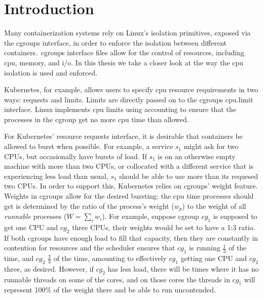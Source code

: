 
\section{Introduction}
\label{sec:introduction}

Many containerization systems rely on Linux's isolation primitives, exposed via
the cgroups interface, in order to enforce the isolation between different
containers.\ cgroups interface files allow for the control of resources,
including cpu, memory, and i/o. In this thesis we take a closer look at the way
the cpu isolation is used and enforced. 

Kubernetes\cite{kubernetes}, for example, allows users to specify cpu resource
requirements in two ways: requests and limits. Limits are directly passed on to
the cgroups cpu.limit interface. Linux implements cpu limits using accounting to
ensure that the processes in the cgroup get no more cpu time than
allowed.

For Kubernetes' resource requests interface, it is desirable that containers be
allowed to burst when possible. For example, a service $s_1$ might ask for two
CPUs, but occasionally have bursts of load. If $s_1$ is on an otherwise empty
machine with more than two CPUs, or collocated with a different service that is
experiencing less load than usual, $s_1$ should be able to use more than its
requesed two CPUs. In order to support this, Kubernetes relies on cgroups'
weight feature. Weights in cgroups allow for the desired bursting: the cpu time
processes should get is determined by the ratio of the process's weight ($w_p$)
to the weight of all \textit{runnable} processes ($W = \sum_i w_i$). For
example, suppose cgroup $cg_1$ is supposed to get one CPU and $cg_2$ three CPUs,
their weights would be set to have a 1:3 ratio. If both cgroups have enough load
to fill that capacity, then they are constantly in contention for resources and
the scheduler ensures that $cg_1$ is running $\frac{1}{3}$ of the time, and
$cg_2$ $\frac{2}{3}$ of the time, amounting to effectively $cg_1$ getting one
CPU and $cg_2$ three, as desired. However, if $cg_2$ has less load, there will
be times where it has no runnable threads on some of the cores, and on those
cores the threads in $cg_1$ will represent 100\% of the weight there and be able
to run uncontended.


